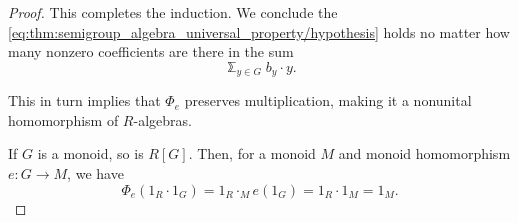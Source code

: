 \begin{proof}
  This completes the induction. We conclude the \eqref{eq:thm:semigroup_algebra_universal_property/hypothesis} holds no matter how many nonzero coefficients are there in the sum
  \begin{equation*}
    \Bbbsum_{y \in G} b_y \cdot y.
  \end{equation*}

  This in turn implies that \( \Phi_e \) preserves multiplication, making it a nonunital homomorphism of \( R \)-algebras.

  If \( G \) is a monoid, so is \( R[G] \). Then, for a monoid \( M \) and monoid homomorphism \( e: G \to M \), we have
  \begin{equation*}
    \Phi_e(1_R \cdot 1_G) = 1_R \cdot_M e(1_G) = 1_R \cdot 1_M = 1_M.
  \end{equation*}
\end{proof}

